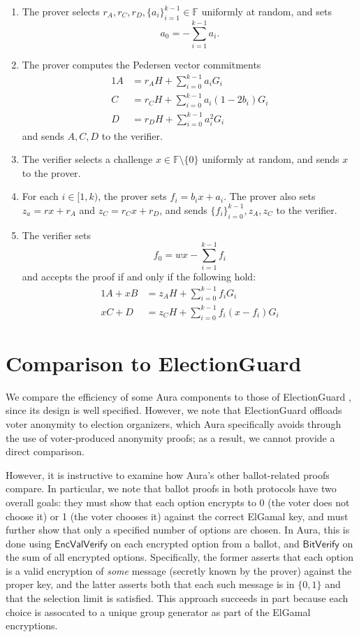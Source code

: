 \documentclass{llncs}
\newcommand{\F}{\mathbb{F}}
\newcommand{\func}[1]{\mathsf{#1}}
\begin{document}
\begin{enumerate}
    \item The prover selects $r_A, r_C, r_D, \{a_i\}_{i=1}^{k-1} \in \F$ uniformly at random, and sets \[ a_0 = - \sum_{i=1}^{k-1} a_i. \]
    \item The prover computes the Pedersen vector commitments
    \begin{alignat*}{1}
        A &= r_A H + \sum_{i=0}^{k-1} a_i G_i \\
        C &= r_C H + \sum_{i=0}^{k-1} a_i(1 - 2b_i) G_i \\
        D &= r_D H + \sum_{i=0}^{k-1} a_i^2 G_i
    \end{alignat*}
    and sends $A, C, D$ to the verifier.
    \item The verifier selects a challenge $x \in \F \setminus \{0\}$ uniformly at random, and sends $x$ to the prover.
    \item For each $i \in [1,k)$, the prover sets $f_i = b_i x + a_i$.
    The prover also sets $z_a = rx + r_A$ and $z_C = r_C x + r_D$, and sends $\{f_i\}_{i=0}^{k-1}, z_A, z_C$ to the verifier.
    \item The verifier sets \[ f_0 = wx - \sum_{i=1}^{k-1} f_i \] and accepts the proof if and only if the following hold:
    \begin{alignat*}{1}
        A + xB &= z_A H + \sum_{i=0}^{k-1} f_i G_i \\
        xC + D &= z_C H + \sum_{i=0}^{k-1} f_i(x - f_i) G_i
    \end{alignat*}
\end{enumerate}


\section{Comparison to ElectionGuard}
\label{app:efficiency}

We compare the efficiency of some Aura components to those of ElectionGuard \cite{electionguard}, since its design is well specified.
However, we note that ElectionGuard offloads voter anonymity to election organizers, which Aura specifically avoids through the use of voter-produced anonymity proofs; as a result, we cannot provide a direct comparison.

However, it is instructive to examine how Aura's other ballot-related proofs compare.
In particular, we note that ballot proofs in both protocols have two overall goals: they must show that each option encrypts to 0 (the voter does not choose it) or 1 (the voter chooses it) against the correct ElGamal key, and must further show that only a specified number of options are chosen.
In Aura, this is done using $\func{EncValVerify}$ on each encrypted option from a ballot, and $\func{BitVerify}$ on the sum of all encrypted options.
Specifically, the former asserts that each option is a valid encryption of \textit{some} message (secretly known by the prover) against the proper key, and the latter asserts both that each such message is in $\{0,1\}$ and that the selection limit is satisfied.
This approach succeeds in part because each choice is assocated to a unique group generator as part of the ElGamal encryptions.
\end{document}

